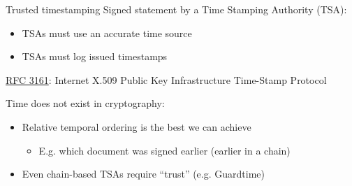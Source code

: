 \begin{frame}{Trusted timestamping}
  \pause
  Signed statement by a Time Stamping Authority (TSA):
  \begin{itemize}[<+(1)->]
    \item TSAs must use an accurate time source
    \item TSAs must log issued timestamps
  \end{itemize}

  \vspace*{0.5em}

  \pause
  \href{https://datatracker.ietf.org/doc/html/rfc3161}{RFC 3161}: Internet X.509 Public Key Infrastructure Time-Stamp Protocol

  \vspace*{0.5em}

  \pause
  Time does not exist in cryptography:
  \begin{itemize}[<+(1)->]
    \item Relative temporal ordering is the best we can achieve
    \begin{itemize}
      \item E.g. which document was signed earlier (earlier in a chain)
    \end{itemize}
    \item Even chain-based TSAs require \enquote{trust} (e.g. Guardtime)
  \end{itemize}
\end{frame}

